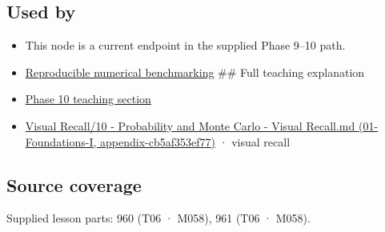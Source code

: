 \subsection{Used by}\label{appendix-c83016554b1e-used-by}

\begin{itemize}
\item
  This node is a current endpoint in the supplied Phase 9--10 path.
\item
  \hyperref[appendix-b9db93e28371]{Reproducible numerical benchmarking} \#\# Full teaching explanation
\item
  \hyperref[02-foundations-ii-ch030-inference-and-error-metrics-need-explicit-assumptions]{Phase 10 teaching section}
\item
  \href{../01-Foundations-I/main.pdf\#nameddest=appendix-cb5af353ef77}{Visual Recall/10 - Probability and Monte Carlo - Visual Recall.md (01-Foundations-I, appendix-cb5af353ef77)} · visual recall
\end{itemize}

\subsection{Source coverage}\label{appendix-c83016554b1e-source-coverage}

Supplied lesson parts: 960 (T06 · M058), 961 (T06 · M058).
